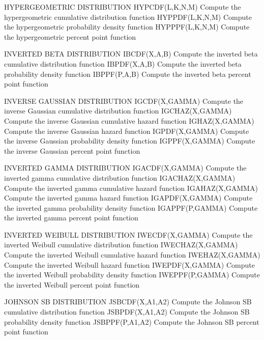 HYPERGEOMETRIC DISTRIBUTION
   HYPCDF(L,K,N,M)    Compute the hypergeometric cumulative
                      distribution function
   HYPPDF(L,K,N,M)    Compute the hypergeometric probability density
                      function
   HYPPPF(L,K,N,M)    Compute the hypergeometric percent point function
 
INVERTED BETA DISTRIBUTION
   IBCDF(X,A,B)       Compute the inverted beta cumulative
                      distribution function
   IBPDF(X,A,B)       Compute the inverted beta probability density
                      function
   IBPPF(P,A,B)       Compute the inverted beta percent point function
 
INVERSE GAUSSIAN DISTRIBUTION
   IGCDF(X,GAMMA)     Compute the inverse Gaussian cumulative
                      distribution function
   IGCHAZ(X,GAMMA)    Compute the inverse Gaussian cumulative
                      hazard function
   IGHAZ(X,GAMMA)     Compute the inverse Gaussian hazard function
   IGPDF(X,GAMMA)     Compute the inverse Gaussian probability density
                      function
   IGPPF(X,GAMMA)     Compute the inverse Gaussian percent point
                      function
 
INVERTED GAMMA DISTRIBUTION
   IGACDF(X,GAMMA)    Compute the inverted gamma cumulative
                      distribution function
   IGACHAZ(X,GAMMA)   Compute the inverted gamma cumulative hazard
                      function
   IGAHAZ(X,GAMMA)    Compute the inverted gamma hazard function
   IGAPDF(X,GAMMA)    Compute the inverted gamma probability density
                      function
   IGAPPF(P,GAMMA)    Compute the inverted gamma percent point
                      function
 
INVERTED WEIBULL DISTRIBUTION
   IWECDF(X,GAMMA)    Compute the inverted Weibull cumulative
                      distribution function
   IWECHAZ(X,GAMMA)   Compute the inverted Weibull cumulative
                      hazard function
   IWEHAZ(X,GAMMA)    Compute the inverted Weibull hazard function
   IWEPDF(X,GAMMA)    Compute the inverted Weibull probability density
                      function
   IWEPPF(P,GAMMA)    Compute the inverted Weibull percent point
                      function
 
JOHNSON SB DISTRIBUTION
   JSBCDF(X,A1,A2)    Compute the Johnson SB cumulative distribution
                      function
   JSBPDF(X,A1,A2)    Compute the Johnson SB probability density
                      function
   JSBPPF(P,A1,A2)    Compute the Johnson SB percent point function
 
